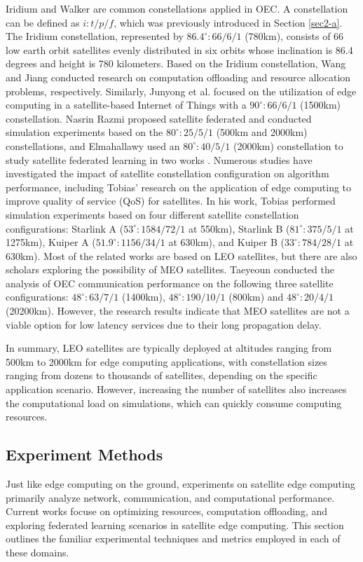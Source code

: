\documentclass[lettersize,journal]{IEEEtran}
\begin{document}
Iridium and Walker are common constellations applied in OEC. A constellation can be defined as $i:t/p/f$, which was previously introduced in Section \ref{sec2-a}. The Iridium constellation, represented by $86.4^\circ:66/6/1$ (780km), consists of 66 low earth orbit satellites evenly distributed in six orbits whose inclination is 86.4 degrees and height is 780 kilometers. Based on the Iridium constellation, Wang \cite{RN4} and Jiang \cite{RN58} conducted research on computation offloading and resource allocation problems, respectively. Similarly, Junyong et al. \cite{RN56} focused on the utilization of edge computing in a satellite-based Internet of Things with a $90^\circ:66/6/1$ (1500km) constellation.  Nasrin Razmi \cite{RN209} proposed satellite federated and conducted simulation experiments based on the $80^\circ:25/5/1$ (500km and 2000km) constellations, and Elmahallawy used an $80^\circ:40/5/1$ (2000km) constellation to study satellite federated learning in two works \cite{RN210,RN212}. Numerous studies have investigated the impact of satellite constellation configuration on algorithm performance, including Tobias' research on the application of edge computing to improve quality of service (QoS) for satellites. In his work, Tobias \cite{RN239,RN105} performed simulation experiments based on four different satellite constellation configurations: Starlink A ($53^\circ:1584/72/1$ at 550km), Starlink B ($81^\circ:375/5/1$ at 1275km), Kuiper A ($51.9^\circ:1156/34/1$ at 630km), and Kuiper B ($33^\circ:784/28/1$ at 630km). Most of the related works are based on LEO satellites, but there are also scholars exploring the possibility of MEO satellites. Taeyeoun \cite{RN60} conducted the analysis of OEC communication performance on the following three satellite configurations: $48^\circ:63/7/1$ (1400km), $48^\circ:190/10/1$ (800km) and $48^\circ:20/4/1$ (20200km). However, the research results indicate that MEO satellites are not a viable option for low latency services due to their long propagation delay.

In summary, LEO satellites are typically deployed at altitudes ranging from 500km to 2000km for edge computing applications, with constellation sizes ranging from dozens to thousands of satellites, depending on the specific application scenario. However, increasing the number of satellites also increases the computational load on simulations, which can quickly consume computing resources. 

\subsection{Experiment Methods}
Just like edge computing on the ground, experiments on satellite edge computing primarily analyze network, communication, and computational performance. Current works focuse on optimizing resources, computation offloading, and exploring federated learning scenarios in satellite edge computing. This section outlines the familiar experimental techniques and metrics employed in each of these domains.
\end{document}
